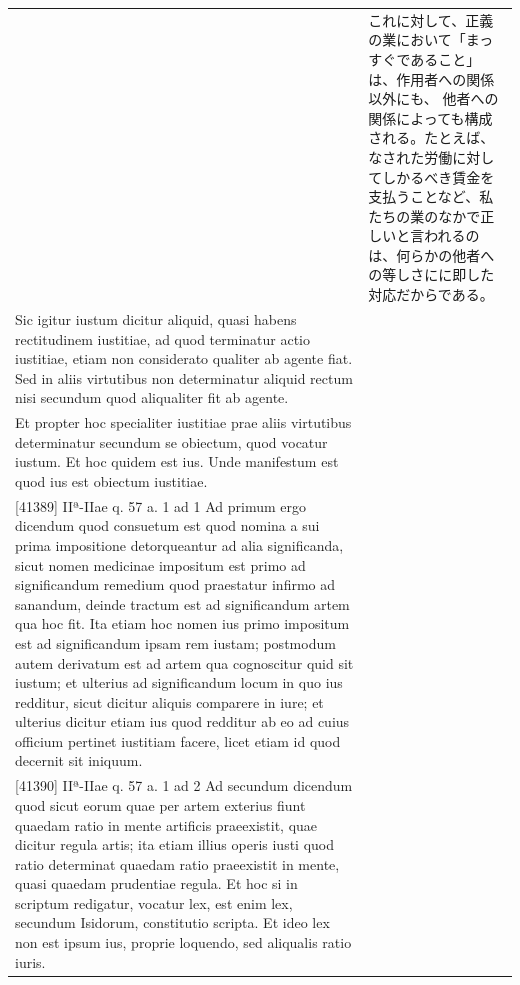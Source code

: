 \documentclass[paper=a4paper,fontsize=10pt,jafontsize=9pt,titlepage]{jlreq}
\begin{document}
\begin{longtable}{p{21em}p{21em}}
&

これに対して、正義の業において「まっすぐであること」は、作用者への関係以外にも、
 他者への関係によっても構成される。たとえば、なされた労働に対してしかるべき賃金を支払うことなど、私たちの業のなかで正しいと言われるのは、何らかの他者への等しさにに即した対応だからである。



\\



Sic igitur iustum dicitur aliquid, quasi habens
 rectitudinem iustitiae, ad quod terminatur actio iustitiae, etiam non
 considerato qualiter ab agente fiat. Sed in aliis virtutibus non
 determinatur aliquid rectum nisi secundum quod aliqualiter fit ab
 agente. 



&


\\



Et propter hoc specialiter iustitiae prae aliis virtutibus
 determinatur secundum se obiectum, quod vocatur iustum. Et hoc quidem
 est ius. Unde manifestum est quod ius est obiectum iustitiae.


&


\\



[41389] IIª-IIae q. 57 a. 1 ad 1 Ad primum ergo dicendum quod consuetum est quod nomina a sui prima impositione detorqueantur ad alia significanda, sicut nomen medicinae impositum est primo ad significandum remedium quod praestatur infirmo ad sanandum, deinde tractum est ad significandum artem qua hoc fit. Ita etiam hoc nomen ius primo impositum est ad significandum ipsam rem iustam; postmodum autem derivatum est ad artem qua cognoscitur quid sit iustum; et ulterius ad significandum locum in quo ius redditur, sicut dicitur aliquis comparere in iure; et ulterius dicitur etiam ius quod redditur ab eo ad cuius officium pertinet iustitiam facere, licet etiam id quod decernit sit iniquum.

&


\\



[41390] IIª-IIae q. 57 a. 1 ad 2 Ad secundum dicendum quod sicut eorum quae per artem exterius fiunt quaedam ratio in mente artificis praeexistit, quae dicitur regula artis; ita etiam illius operis iusti quod ratio determinat quaedam ratio praeexistit in mente, quasi quaedam prudentiae regula. Et hoc si in scriptum redigatur, vocatur lex, est enim lex, secundum Isidorum, constitutio scripta. Et ideo lex non est ipsum ius, proprie loquendo, sed aliqualis ratio iuris.


\end{longtable}
\end{document}
